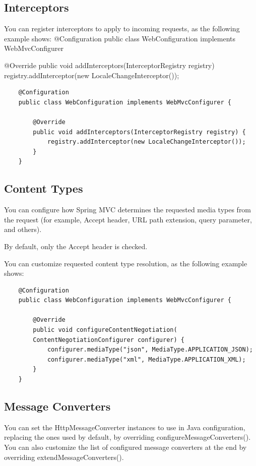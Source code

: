 \documentclass{scrartcl}
\begin{document}
\subsection{Interceptors}

You can register interceptors to apply to incoming requests, as the following example shows:
@Configuration
public class WebConfiguration implements WebMvcConfigurer {

    @Override
    public void addInterceptors(InterceptorRegistry registry) {
        registry.addInterceptor(new LocaleChangeInterceptor());
    }
}

\begin{lstlisting}
    @Configuration
    public class WebConfiguration implements WebMvcConfigurer {

        @Override
        public void addInterceptors(InterceptorRegistry registry) {
            registry.addInterceptor(new LocaleChangeInterceptor());
        }
    }
\end{lstlisting}

\subsection{Content Types}

You can configure how Spring MVC determines the requested media types from the request (for example, Accept header, URL path extension, query parameter, and others).

By default, only the Accept header is checked.

You can customize requested content type resolution, as the following example shows:

\begin{lstlisting}
    @Configuration
    public class WebConfiguration implements WebMvcConfigurer {

        @Override
        public void configureContentNegotiation(
        ContentNegotiationConfigurer configurer) {
            configurer.mediaType("json", MediaType.APPLICATION_JSON);
            configurer.mediaType("xml", MediaType.APPLICATION_XML);
        }
    }
\end{lstlisting}

\subsection{Message Converters}

You can set the HttpMessageConverter instances to use in Java configuration, replacing the ones used by default, by overriding configureMessageConverters(). You can also customize the list of configured message converters at the end by overriding extendMessageConverters().
\end{document}
